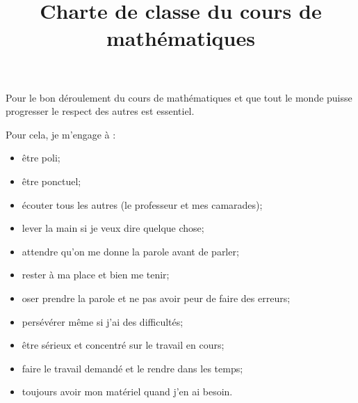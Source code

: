 \documentclass[a4paper, 14pt]{extarticle}
\author{}
\title{Charte de classe du cours de mathématiques}
\date{}
\begin{document}
\maketitle	
\thispagestyle{empty}

\vspace*{-1cm}
	

Pour le bon déroulement du cours de mathématiques et que tout le monde puisse progresser le respect des autres est essentiel.

\vspace*{1cm}

Pour cela, je m'engage à :

\begin{itemize}
	\item être poli;
	\item être ponctuel;
	\item écouter tous les autres (le professeur et mes camarades);
	\item lever la main si je veux dire quelque chose;
	\item attendre qu'on me donne la parole avant de parler;
	\item rester à ma place et bien me tenir;
	\item oser prendre la parole et ne pas avoir peur de faire des erreurs;
	\item persévérer même si j'ai des difficultés; 
	\item être sérieux et concentré sur le travail en cours;
	\item faire le travail demandé et le rendre dans les temps;
	\item toujours avoir mon matériel quand j'en ai besoin.
	
\end{itemize}
%
%	
\end{document}
